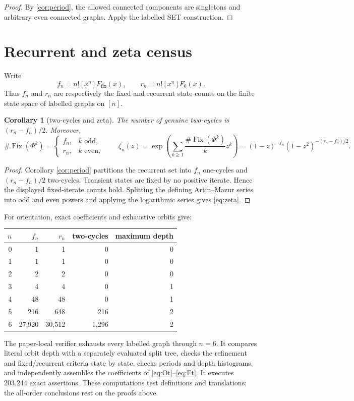\documentclass[10pt,a4paper]{amsart}
\newtheorem{corollary}[theorem]{Corollary}
\theoremstyle{definition}
\theoremstyle{remark}
\newcommand{\Fix}{\operatorname{Fix}}
\begin{document}
\begin{proof}
By \cref{cor:period}, the allowed connected components are singletons and
arbitrary even connected graphs. Apply the labelled SET construction.
\end{proof}

\section{Recurrent and zeta census}\label{sec:census}

Write
\[
 f_n=n![x^n]F_{\mathrm{fix}}(x),\qquad
 r_n=n![x^n]F_0(x).
\]
Thus \(f_n\) and \(r_n\) are respectively the fixed and recurrent state
counts on the finite state space of labelled graphs on \([n]\).

\begin{corollary}[two-cycles and zeta]\label{cor:zeta}
The number of genuine two-cycles is \((r_n-f_n)/2\). Moreover,
\begin{equation}
 \#\Fix(\Phi^k)=
 \begin{cases}f_n,&k\text{ odd},\\r_n,&k\text{ even},\end{cases}
 \qquad
 \zeta_n(z)=\exp\!\left(\sum_{k\geq1}\frac{\#\Fix(\Phi^k)}{k}z^k\right)
 =(1-z)^{-f_n}(1-z^2)^{-(r_n-f_n)/2}.                    \label{eq:zeta}
\end{equation}
\end{corollary}

\begin{proof}
Corollary \ref{cor:period} partitions the recurrent set into \(f_n\)
one-cycles and \((r_n-f_n)/2\) two-cycles. Transient states are fixed by no
positive iterate. Hence the displayed fixed-iterate counts hold. Splitting
the defining Artin--Mazur series \cite{ArtinMazur1965} into odd and even
powers and applying the logarithmic series gives \eqref{eq:zeta}.
\end{proof}

For orientation, exact coefficients and exhaustive orbits give:
\begin{center}
\begin{tabular}{@{}rrrrr@{}}
\toprule
\(n\)&\(f_n\)&\(r_n\)&two-cycles&maximum depth\\
\midrule
0&1&1&0&0\\
1&1&1&0&0\\
2&2&2&0&0\\
3&4&4&0&1\\
4&48&48&0&1\\
5&216&648&216&2\\
6&27,920&30,512&1,296&2\\
\bottomrule
\end{tabular}
\end{center}
The paper-local verifier exhausts every labelled graph through \(n=6\).  It
compares literal orbit depth with a separately evaluated split tree, checks
the refinement and fixed/recurrent criteria state by state, checks periods
and depth histograms, and independently assembles the coefficients of
\eqref{eq:Ot}--\eqref{eq:Ft}. It executes 203,244 exact assertions. These
computations test definitions and translations; the all-order conclusions
rest on the proofs above.
\end{document}
